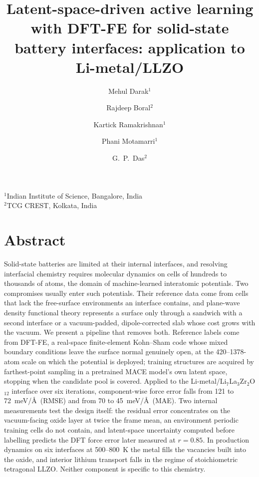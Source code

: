 \documentclass[11pt]{article}
\begin{document}
\title{Latent-space-driven active learning with DFT-FE for solid-state battery
interfaces: application to Li-metal/LLZO}


\author{
Mehul Darak$^{1}$ \and
Rajdeep Boral$^{2}$ \and
Kartick Ramakrishnan$^{1}$ \and
Phani Motamarri$^{1}$ \and
G.~P.~Das$^{2}$
}
\date{}
\maketitle

\noindent
$^{1}$Indian Institute of Science, Bangalore, India \\
$^{2}$TCG CREST, Kolkata, India \\

\vspace{1em}

\section*{Abstract}
Solid-state batteries are limited at their internal interfaces, and resolving
interfacial chemistry requires molecular dynamics on cells of hundreds to
thousands of atoms, the domain of machine-learned interatomic potentials. Two
compromises usually enter such potentials. Their reference data come from cells
that lack the free-surface environments an interface contains, and plane-wave
density functional theory represents a surface only through a sandwich with a
second interface or a vacuum-padded, dipole-corrected slab whose cost grows with
the vacuum. We present a pipeline that removes both. Reference labels come from
DFT-FE, a real-space finite-element Kohn--Sham code whose mixed boundary
conditions leave the surface normal genuinely open, at the 420--1378-atom scale
on which the potential is deployed; training structures are acquired by
farthest-point sampling in a pretrained MACE model's own latent space, stopping
when the candidate pool is covered. Applied to the
Li-metal/Li$_7$La$_3$Zr$_2$O$_{12}$ interface over six iterations,
component-wise force error falls from 121 to 72~meV/\AA\ (RMSE) and from 70 to
45~meV/\AA\ (MAE). Two internal measurements test the design itself: the
residual error concentrates on the vacuum-facing oxide layer at twice the frame
mean, an environment periodic training cells do not contain, and latent-space
uncertainty computed before labelling predicts the DFT force error later
measured at $r=0.85$. In production dynamics
on six interfaces at 500--800~K the metal fills the vacancies built into the
oxide, and interior lithium transport falls in the regime of stoichiometric
tetragonal LLZO. Neither component is specific to this chemistry.
\end{document}

